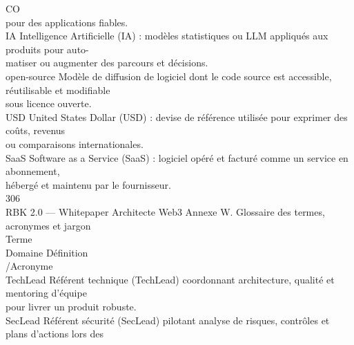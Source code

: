 \documentclass[12pt,landscape,a4paper]{article}
\begin{document}
CO\\
pour des applications fiables.\\
\vspace{0.5em}
IA                                                                           Intelligence Artificielle (IA) : modèles statistiques ou LLM appliqués aux produits pour auto-\\
matiser ou augmenter des parcours et décisions.\\
\vspace{0.5em}
open-source                                                                  Modèle de diffusion de logiciel dont le code source est accessible, réutilisable et modifiable\\
sous licence ouverte.\\
\vspace{0.5em}
USD                                                                          United States Dollar (USD) : devise de référence utilisée pour exprimer des coûts, revenus\\
ou comparaisons internationales.\\
\vspace{0.5em}
SaaS                                                                         Software as a Service (SaaS) : logiciel opéré et facturé comme un service en abonnement,\\
hébergé et maintenu par le fournisseur.\\
\vspace{0.5em}
\vspace{0.5em}
\vspace{0.5em}
\vspace{0.5em}
306\\
RBK 2.0 — Whitepaper Architecte Web3                                               Annexe W. Glossaire des termes, acronymes et jargon\\
\vspace{0.5em}
\vspace{0.5em}
Terme\\
Domaine    Définition\\
/Acronyme\\
TechLead                                Référent technique (TechLead) coordonnant architecture, qualité et mentoring d’équipe\\
pour livrer un produit robuste.\\
\vspace{0.5em}
SecLead                                 Référent sécurité (SecLead) pilotant analyse de risques, contrôles et plans d’actions lors des\\
\end{document}
